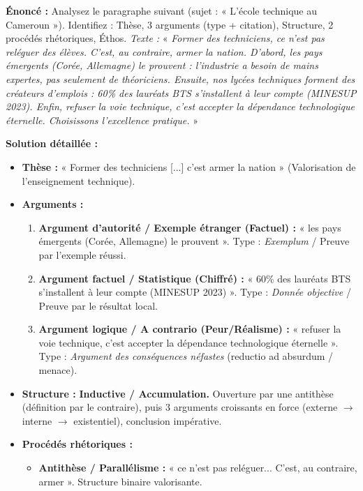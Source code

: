\documentclass[11pt]{article}
\begin{document}
\begin{exoresolu}
\textbf{Énoncé :} Analysez le paragraphe suivant (sujet : « L'école technique au Cameroun »). Identifiez : Thèse, 3 arguments (type + citation), Structure, 2 procédés rhétoriques, Éthos.
\textit{Texte :} « \emph{Former des techniciens, ce n'est pas reléguer des élèves. C'est, au contraire, armer la nation. D'abord, les pays émergents (Corée, Allemagne) le prouvent : l'industrie a besoin de mains expertes, pas seulement de théoriciens. Ensuite, nos lycées techniques forment des créateurs d'emplois : 60\% des lauréats BTS s'installent à leur compte (MINESUP 2023). Enfin, refuser la voie technique, c'est accepter la dépendance technologique éternelle. Choisissons l'excellence pratique.} »

\tcblower
\textbf{Solution détaillée :}
\begin{itemize}
    \item \textbf{Thèse :} « Former des techniciens [...] c'est armer la nation » (Valorisation de l'enseignement technique).
    \item \textbf{Arguments :}
        \begin{enumerate}
            \item \textbf{Argument d'autorité / Exemple étranger (Factuel) :} « les pays émergents (Corée, Allemagne) le prouvent ». Type : \emph{Exemplum} / Preuve par l'exemple réussi.
            \item \textbf{Argument factuel / Statistique (Chiffré) :} « 60\% des lauréats BTS s'installent à leur compte (MINESUP 2023) ». Type : \emph{Donnée objective} / Preuve par le résultat local.
            \item \textbf{Argument logique / A contrario (Peur/Réalisme) :} « refuser la voie technique, c'est accepter la dépendance technologique éternelle ». Type : \emph{Argument des conséquences néfastes} (reductio ad absurdum / menace).
        \end{enumerate}
    \item \textbf{Structure :} \textbf{Inductive / Accumulation.} Ouverture par une antithèse (définition par le contraire), puis 3 arguments croissants en force (externe $\to$ interne $\to$ existentiel), conclusion impérative.
    \item \textbf{Procédés rhétoriques :}
        \begin{itemize}
            \item \textbf{Antithèse / Parallélisme :} « ce n'est pas reléguer... C'est, au contraire, armer ». Structure binaire valorisante.

\end{itemize}
\end{itemize}
\end{exoresolu}
\end{document}
